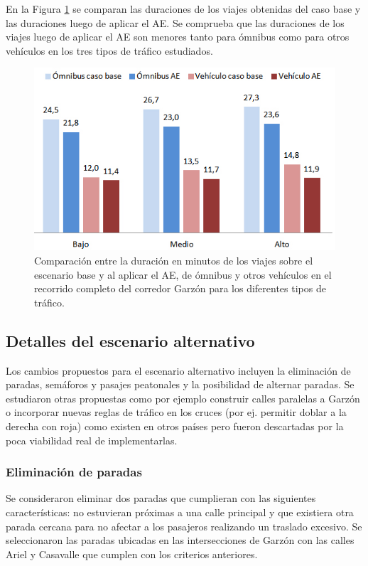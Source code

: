 En la Figura \ref{fig:duracion_viajes} se comparan las duraciones de los viajes obtenidas del caso base y las duraciones luego de aplicar el AE. Se comprueba que las duraciones de los viajes luego de aplicar el AE son menores tanto para ómnibus como para otros vehículos en los tres tipos de tráfico estudiados. 
 
\begin{figure}[H]
	\centering
	\includegraphics[width=0.8\linewidth]{Figures/duracion_viajes}
	\caption[Comparación de la duración en minutos de los viajes sobre el escenario base y al aplicar el algoritmo evolutivo.]{Comparación entre la duración en minutos de los viajes sobre el escenario base y al aplicar el AE, de ómnibus y otros vehículos en el recorrido completo del corredor Garzón para los diferentes tipos de tráfico.}
	\label{fig:duracion_viajes}
\end{figure}



\subsection{Detalles del escenario alternativo}
Los cambios propuestos para el escenario alternativo incluyen la eliminación de paradas, semáforos y pasajes peatonales y la posibilidad de alternar paradas. Se estudiaron otras propuestas como por ejemplo construir calles paralelas a Garzón o incorporar nuevas reglas de tráfico en los cruces (por ej. permitir doblar a la derecha con roja) como existen en otros países pero fueron descartadas por la poca viabilidad real de implementarlas.

\subsubsection{Eliminación de paradas}
Se consideraron eliminar dos paradas que cumplieran con las siguientes características: no estuvieran próximas a una calle principal y que existiera otra parada cercana para no afectar a los pasajeros realizando un traslado excesivo. Se seleccionaron las paradas ubicadas en las intersecciones de Garzón con las calles Ariel y Casavalle que cumplen con los criterios anteriores.

